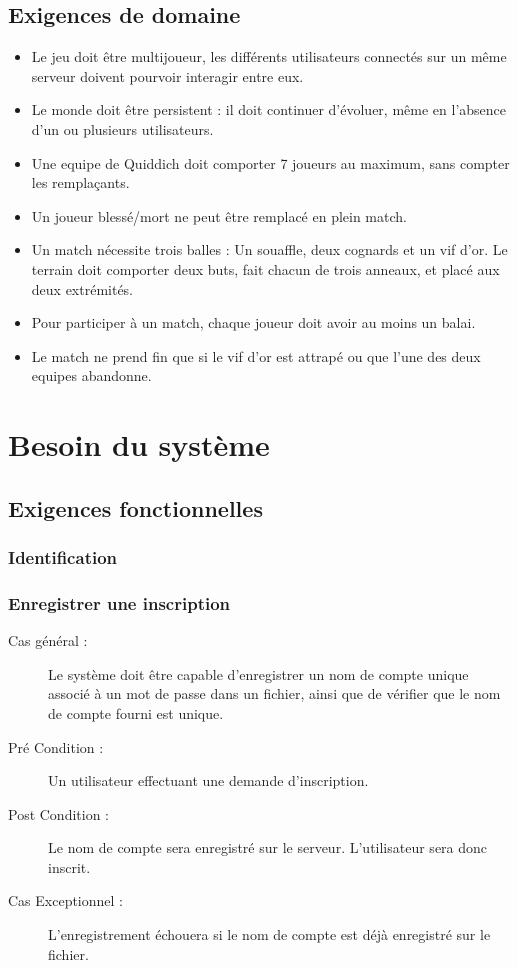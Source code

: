 \documentclass[a4paper]{report}
\begin{document}

\section{Exigences de domaine}
\begin{itemize}
    \item Le jeu doit être multijoueur, les différents \glspl{utilisateur} connectés sur un même \gls{serveur} doivent pourvoir interagir entre eux.
    \item Le monde doit être persistent : il doit continuer d'évoluer, même en l'absence d'un ou plusieurs \glspl{utilisateur}.
    \item Une \gls{equipe} de Quiddich doit comporter 7 \glspl{joueur} au maximum, sans compter les remplaçants.
    \item Un \gls{joueur} blessé/mort ne peut être remplacé en plein match.
    \item Un match nécessite trois balles : Un souaffle, deux cognards et un vif d'or. Le terrain doit comporter deux buts, fait chacun de trois anneaux, et placé aux deux extrémités.
    \item Pour participer à un match, chaque \gls{joueur} doit avoir au moins un balai.
    \item Le match ne prend fin que si le vif d'or est attrapé ou que l'une des deux \glspl{equipe} abandonne.

\end{itemize}


\chapter{Besoin du système}
\section{Exigences fonctionnelles}

\subsection{Identification}
\subsection{Enregistrer une inscription}
\begin{description}
    \item[Cas général :] Le système doit être capable d'enregistrer un nom de compte unique associé à un mot de passe dans un fichier, ainsi que de vérifier que le nom de compte fourni est unique.
    \item[Pré Condition  :] Un \gls{utilisateur} effectuant une demande d'inscription.
    \item[Post Condition :] Le nom de compte sera enregistré sur le \gls{serveur}. L'\gls{utilisateur} sera donc inscrit.
    \item[Cas Exceptionnel :] L'enregistrement échouera si le nom de compte est déjà enregistré sur le fichier.
\end{description}
\end{document}

